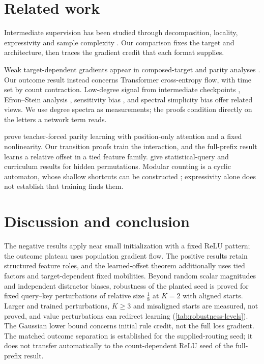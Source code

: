 \section{Related work}
\label{sec:related}

Intermediate supervision has been studied through decomposition, locality, expressivity and
sample complexity \citep{nye2021scratchpads,wies2023subtask,prystawski2023think,abbe2024globality,
feng2023towards,merrill2024expressive,malach2023autoregressive,hanneke2026samplecomplexityautoregressivereasoning,wen2024sparse}.
Our comparison fixes the target and architecture, then traces the gradient credit that each format supplies.

Weak target-dependent gradients appear in composed-target and parity analyses
\citep{shalevshwartz2017failures,abbe2021staircase,abbe2022mergedstaircase,abbe2023sgd,abbe2025parities}.
Our outcome result instead concerns Transformer cross-entropy flow, with time set by count contraction.
Low-degree signal from intermediate checkpoints \citep{panigrahi2025progressive}, Efron--Stein
analysis \citep{li2025noise}, sensitivity bias \citep{hahn2024sensitive}, and spectral simplicity
bias \citep{yang2019spectral} offer related views. We use degree spectra as measurements;
the proofs condition directly on the letters a network term reads.

\citet{kim2024parity} prove teacher-forced parity learning with position-only attention and a fixed
nonlinearity. Our transition proofs train the interaction, and the full-prefix result learns a
relative offset in a tied feature family. \citet{wang2025compositional} give statistical-query
and curriculum results for hidden permutations. Modular counting is a cyclic automaton,
whose shallow shortcuts can be constructed \citep{liu2023automata}; expressivity alone does
not establish that training finds them.

\section{Discussion and conclusion}
\label{sec:conclusion}
\label{sec:discussion}

The negative results apply near small initialization with a fixed ReLU pattern; the outcome
plateau uses population gradient flow. The positive results retain structured feature roles,
and the learned-offset theorem additionally uses tied factors and target-dependent fixed
mobilities. Beyond random scalar magnitudes and independent distractor biases, robustness of the planted seed is proved for
fixed query--key perturbations of relative size $\frac18$ at $K=2$ with aligned starts. Larger and trained perturbations,
$K\ge3$ and misaligned starts are measured, not proved, and value perturbations can redirect learning
(\cref{tab:robustness-levels}). The Gaussian lower bound concerns initial rule credit, not the full loss gradient.
The matched outcome separation is established for the supplied-routing seed; it does not
transfer automatically to the count-dependent ReLU seed of the full-prefix result.

